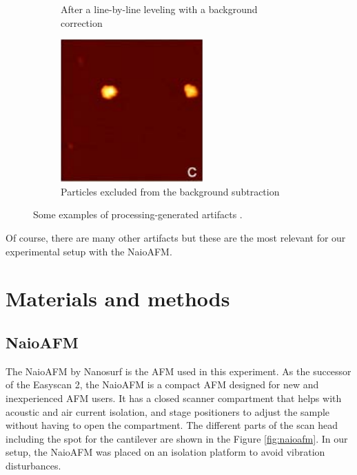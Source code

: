 \documentclass[11pt,a4paper]{article}
\begin{document}
\begin{figure}[H]
\begin{subfigure}[b]{0.3\textwidth}
\caption{After a line-by-line leveling with a background correction}
\label{fig:artifacts_processing_2}
\end{subfigure}
\begin{subfigure}[b]{0.3\textwidth}
\includegraphics[width=\textwidth]{artifacts_processing_3}
\caption{Particles excluded from the background subtraction}
\label{fig:artifacts_processing_3}
\end{subfigure}
\caption{Some examples of processing-generated artifacts \cite{artifacts}.}
\label{fig:artifacts_processing}
\end{figure}

Of course, there are many other artifacts but these are the most relevant for our experimental setup with the NaioAFM.

\section{Materials and methods}

\subsection{NaioAFM}

The NaioAFM by Nanosurf \cite{NaioAFM} is the AFM used in this experiment. As the successor of the Easyscan 2, the NaioAFM is a compact AFM designed for new and inexperienced AFM users. It has a closed scanner compartment that helps with acoustic and air current isolation, and stage positioners to adjust the sample without having to open the compartment. The different parts of the scan head including the spot for the cantilever are shown in the Figure \ref{fig:naioafm}. In our setup, the NaioAFM was placed on an isolation platform to avoid vibration disturbances.
\end{document}
